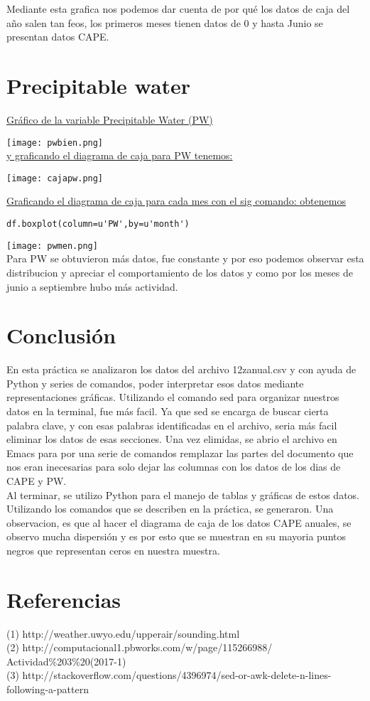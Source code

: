 \documentclass[12pt]{article}
\begin{document}
Mediante esta grafica nos podemos dar cuenta de por qué los datos de caja del año salen tan feos, los primeros meses tienen datos de 0 y hasta Junio se presentan datos CAPE.
\pagebreak
\section{Precipitable water}
\underline{Gráfico de la variable Precipitable Water (PW)}

\texttt{[image: pwbien.png]} \\
\underline{y graficando el diagrama de caja para PW tenemos:}

\texttt{[image: cajapw.png]} \\
\pagebreak

\underline{Graficando el diagrama de caja para cada mes con el sig comando: obtenemos}
\begin{verbatim}
df.boxplot(column=u'PW',by=u'month')
\end{verbatim}
\texttt{[image: pwmen.png]} \\
Para PW se obtuvieron más datos, fue constante y por eso podemos observar esta distribucion y apreciar el comportamiento de los datos y como por los meses de junio a septiembre hubo más actividad. 


\section{Conclusión}
En esta práctica se analizaron los datos del archivo 12zanual.csv y con ayuda de Python y series de comandos, poder interpretar esos datos mediante representaciones gráficas. Utilizando el comando sed para organizar nuestros datos en la terminal, fue más facil. Ya que sed se encarga de buscar cierta palabra clave, y con esas palabras identificadas en el archivo, seria más facil eliminar los datos de esas secciones. Una vez elimidas, se abrio el archivo en Emacs para por una serie de comandos remplazar las partes del documento que nos eran inecesarias para solo dejar las columnas con los datos de los dias de CAPE y PW. \\
Al terminar, se utilizo Python para el manejo de tablas y gráficas de estos datos. Utilizando los comandos que se describen en la práctica, se generaron. Una observacion, es que al hacer el diagrama de caja de los datos CAPE anuales, se observo mucha dispersión y es por esto que se muestran en su mayoria puntos negros que representan ceros en nuestra muestra. 
\section{Referencias}
(1) http://weather.uwyo.edu/upperair/sounding.html \\
(2) http://computacional1.pbworks.com/w/page/115266988/
\\Actividad\%203\%20(2017-1) \\
(3) http://stackoverflow.com/questions/4396974/sed-or-awk-delete-n-lines-following-a-pattern
\end{document}
